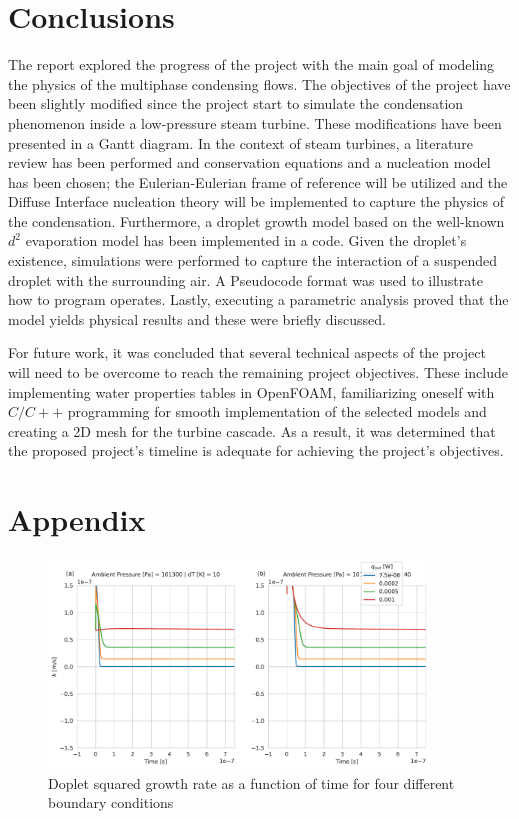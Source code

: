 \documentclass[12pt]{article}
\begin{document}
\section{Conclusions}
The report explored the progress of the project with the main goal of modeling the physics of the multiphase condensing flows. The objectives of the project have been slightly modified since the project start to simulate the condensation phenomenon inside a low-pressure steam turbine. These modifications have been presented in a Gantt diagram. In the context of steam turbines, a literature review has been performed and conservation equations and a nucleation model has been chosen; the Eulerian-Eulerian frame of reference will be utilized and the Diffuse Interface nucleation theory will be implemented to capture the physics of the condensation. Furthermore, a droplet growth model based on the well-known $d^2$ evaporation model has been implemented in a code. Given the droplet's existence, simulations were performed to capture the interaction of a suspended droplet with the surrounding air. A Pseudocode format was used to illustrate how to program operates. Lastly, executing a parametric analysis proved that the model yields physical results and these were briefly discussed. 

For future work, it was concluded that several technical aspects of the project will need to be overcome to reach the remaining project objectives. These include implementing water properties tables in OpenFOAM, familiarizing oneself with $C/C++$ programming for smooth implementation of the selected models and creating a 2D mesh for the turbine cascade. As a result, it was determined that the proposed project's timeline is adequate for achieving the project's objectives.






\cleardoublepage
{}
{}



\newpage
\appendix
{}
\section*{Appendix}\label{s:appendix}
\begin{figure}[H]
    \centering
    \includegraphics[width=0.9\textwidth]{Figures/k.pdf}
    \caption{Doplet squared growth rate as a function of time for four different boundary conditions}
    \label{f:k}
\end{figure}
\pagebreak
\end{document}

